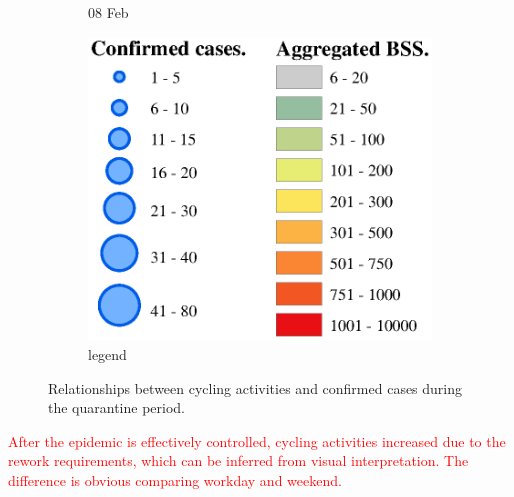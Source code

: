\documentclass[preprints,ijgi,submit,moreauthors]{Definitions/mdpi}
\begin{document}
\begin{figure}[H]
\begin{subfigure}{.3\textwidth}
        \caption{08 Feb}
    \end{subfigure}
    \begin{subfigure}{.3\textwidth}
        \includegraphics[width=\textwidth]{Figures/Relation_with_confrimed_cases/legend7.eps}
        \caption{legend}
    \end{subfigure}
    \caption{Relationships between cycling activities and confirmed cases during the quarantine period.}
    \label{fig:BSS_phase1_2}
\end{figure}
\textcolor{red}{After the epidemic is effectively controlled, cycling activities increased due to the rework requirements, which can be inferred from visual interpretation. The difference is obvious comparing workday and weekend.}
\end{document}
